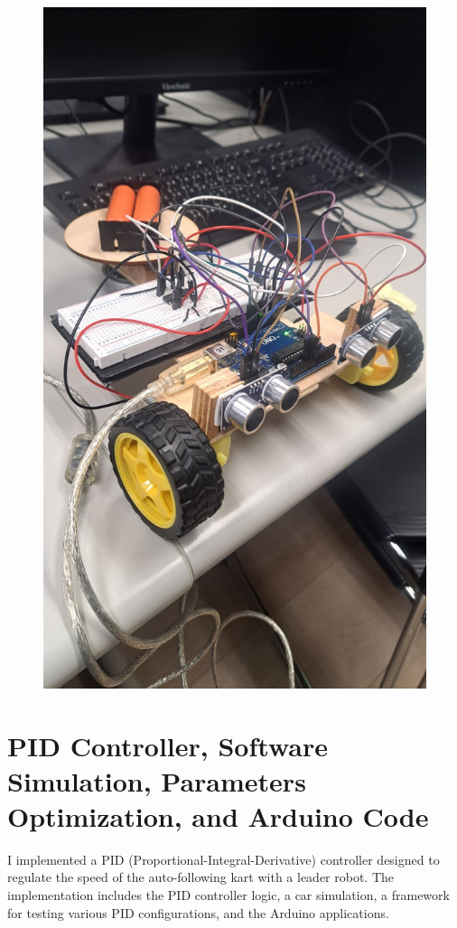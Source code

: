 \documentclass[a4paper,12pt]{article}
\begin{document}
\begin{center}
\begin{figure}[H]
\begin{minipage}[t]{0.45\textwidth}
\includegraphics[width=\textwidth]{./photos/h.jpg}
\end{minipage}
\hfill
\end{figure}\FloatBarrier\end{center}

\section{PID Controller, Software Simulation, Parameters Optimization, and Arduino Code}
I implemented a PID (Proportional-Integral-Derivative) controller designed to regulate the speed of the auto-following kart with a leader robot. The implementation includes the PID controller logic, a car simulation, a framework for testing various PID configurations, and the Arduino applications.
\end{document}
